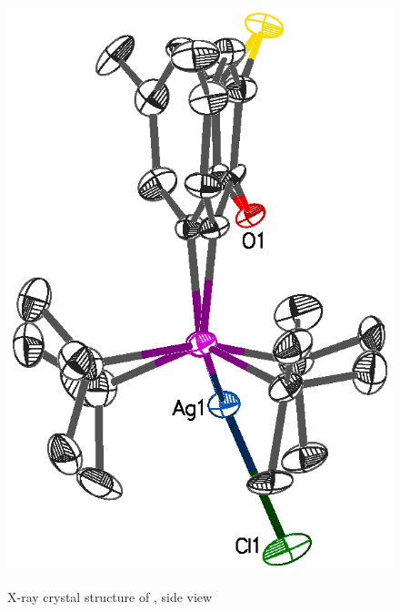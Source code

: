\begin{figure}[htbp]
\begin{center}
\vspace{0.5cm}
\includegraphics[scale=0.8]{../Figures/Crystalthixantphossilverchloridesideview.eps}
\caption[X-ray crystal structure of , side view]{X-ray crystal structure of , side view}
\vspace{0.2cm}
\label{Crystalthixantphossilverchloride:sideview}
\end{center}
\end{figure}
\vspace{0.2cm}

